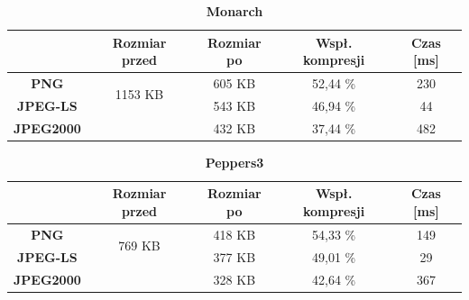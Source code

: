 \begin{table}[!h]
	\centering
	\caption{\textbf{Monarch}}
	\label{my-label}
	\begin{tabular}{|c|c|c|c|c|}                                             
		\hline
		& \textbf{Rozmiar przed} & \textbf{Rozmiar po} & \textbf{Wspł. kompresji} & \textbf{Czas {[}ms{]}} \\ \hline 
		\textbf{PNG}      &          \multicolumn{1}{c|}{\multirow{2}{*}{1153 KB}}             &      605 KB               &          52,44 \%                &            230                 \\\cline{3-5}
		\textbf{JPEG-LS}  &                        &       543 KB             &        46,94 \%                 &        44                  \\\cline{3-5}
		\textbf{JPEG2000} &                        &      432 KB               &        37,44 \%                 &       482               \\ \hline
	\end{tabular}
\end{table}

\begin{table}[!h]
	\centering
	\caption{\textbf{Peppers3}}
	\label{my-label}
	\begin{tabular}{|c|c|c|c|c|}                                             
		\hline
		& \textbf{Rozmiar przed} & \textbf{Rozmiar po} & \textbf{Wspł. kompresji} & \textbf{Czas {[}ms{]}} \\ \hline 
		\textbf{PNG}      &          \multicolumn{1}{c|}{\multirow{2}{*}{769 KB}}             &         418 KB            &        54,33 \%                  &         149                    \\\cline{3-5}
		\textbf{JPEG-LS}  &                        &          377 KB           &         49,01 \%                 &          29                \\\cline{3-5}
		\textbf{JPEG2000} &                        &        328 KB             &      42,64 \%                    &      367                \\ \hline
	\end{tabular}
\end{table}


